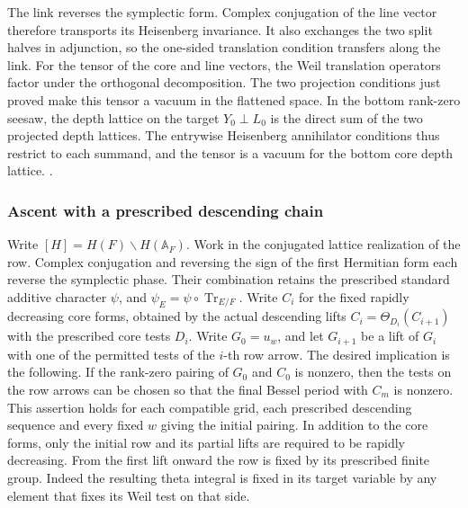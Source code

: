 The link reverses the symplectic form. Complex
conjugation of the line vector therefore transports
its Heisenberg invariance. It also exchanges the
two split halves in adjunction, so the one-sided
translation condition transfers along the link. For
the tensor of the core and line vectors, the Weil
translation operators factor under the orthogonal
decomposition. The two projection conditions just
proved make this tensor a vacuum in the flattened
space. In the bottom rank-zero seesaw, the depth
lattice on the target \(Y_0\perp L_0\) is the direct
sum of the two projected depth lattices. The
entrywise Heisenberg annihilator conditions thus
restrict to each summand, and the tensor is a vacuum
for the bottom core depth lattice.
.

\subsubsection{Ascent with a prescribed descending chain}
Write \([H]=H(F)\backslash H(\mathbb A_F)\). Work in the
conjugated lattice realization of the row. Complex conjugation and
reversing the sign of the first Hermitian form each reverse the
symplectic phase. Their combination retains the prescribed standard
additive character \(\psi\), and \(\psi_E=\psi\circ
\operatorname{Tr}_{E/F}\). Write \(C_i\) for the fixed rapidly
decreasing core forms, obtained by the actual descending lifts
\(C_i=\Theta_{D_i}(C_{i+1})\) with the prescribed core tests
\(D_i\). Write \(G_0=u_w\), and let \(G_{i+1}\) be a lift of
\(G_i\) with one of the permitted tests of the \(i\)-th row arrow.
The desired implication is the following. If the rank-zero pairing
of \(G_0\) and \(C_0\) is nonzero, then the tests on the row
arrows can be chosen so that the final Bessel period with \(C_m\)
is nonzero. This assertion holds for each compatible grid, each
prescribed descending sequence and every fixed \(w\) giving the
initial pairing. In addition to the core forms, only the initial row
and its partial lifts are required to be rapidly decreasing. From the
first lift onward the row is fixed by its prescribed finite group.
Indeed the resulting theta integral is fixed in its target variable
by any element that fixes its Weil test on that side.

